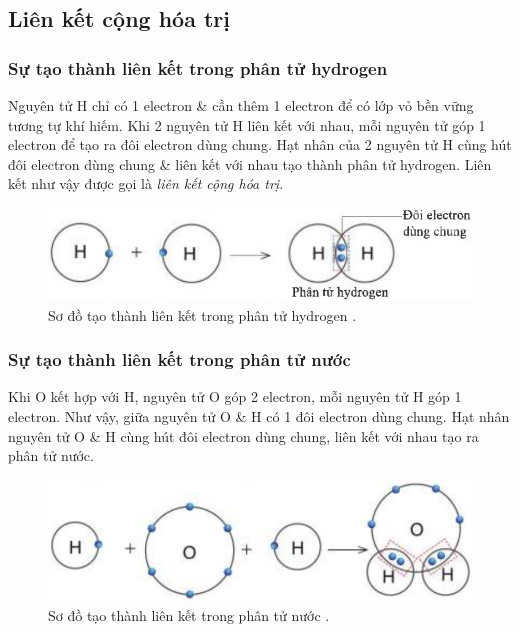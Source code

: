 \documentclass{article}
\begin{document}
\subsection{Liên kết cộng hóa trị}

\subsubsection{Sự tạo thành liên kết trong phân tử hydrogen}
Nguyên tử H chỉ có 1 electron \& cần thêm 1 electron để có lớp vỏ bền vững tương tự khí hiếm. Khi 2 nguyên tử H liên kết với nhau, mỗi nguyên tử góp 1 electron để tạo ra đôi electron dùng chung. Hạt nhân của 2 nguyên tử H cùng hút đôi electron dùng chung \& liên kết với nhau tạo thành phân tử hydrogen. Liên kết như vậy được gọi là \textit{liên kết cộng hóa trị}.
\begin{figure}[H]
	\centering
	\includegraphics[scale=0.3]{hydrogen}
	\caption{Sơ đồ tạo thành liên kết trong phân tử hydrogen .}
\end{figure}

\subsubsection{Sự tạo thành liên kết trong phân tử nước }
Khi O kết hợp với H, nguyên tử O góp 2 electron, mỗi nguyên tử H góp 1 electron. Như vậy, giữa nguyên tử O \& H có 1 đôi electron dùng chung. Hạt nhân nguyên tử O \& H cùng hút đôi electron dùng chung, liên kết với nhau tạo ra phân tử nước.
\begin{figure}[H]
	\centering
	\includegraphics[scale=0.3]{H2O}
	\caption{Sơ đồ tạo thành liên kết trong phân tử nước .}
\end{figure}
\end{document}
